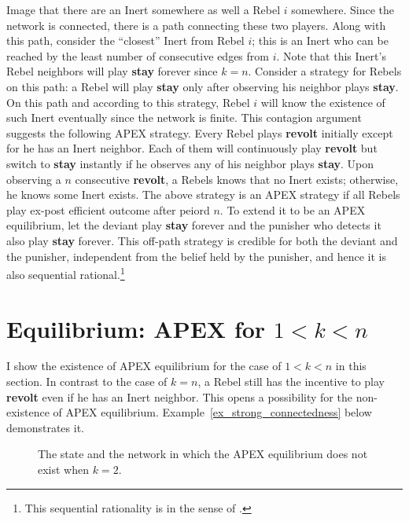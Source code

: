\documentclass[12pt,letter]{article}
\theoremstyle{definition}
\theoremstyle{remark}
\theoremstyle{claim}
\begin{document}
Image that there are an Inert somewhere as well a Rebel $i$ somewhere. Since the network is connected, there is a path connecting these two players. Along with this path, consider the ``closest'' Inert from Rebel $i$; this is an Inert who can be reached by the least number of consecutive edges from $i$. Note that this Inert's Rebel neighbors will play \textbf{stay} forever since $k=n$. Consider a strategy for Rebels on this path: a Rebel will play \textbf{stay} only after observing his neighbor plays \textbf{stay}.  On this path and according to this  strategy, Rebel $i$ will know the existence of such Inert eventually since the network is finite. This contagion argument suggests the following APEX strategy. Every Rebel plays \textbf{revolt} initially except for he has an Inert neighbor. Each of them will continuously play \textbf{revolt} but switch to \textbf{stay} instantly if he observes any of his neighbor plays \textbf{stay}. Upon observing a $n$ consecutive \textbf{revolt}, a Rebels knows that no Inert exists; otherwise, he knows some Inert exists. The above strategy is an APEX strategy if all Rebels play ex-post efficient outcome after peiord $n$. To extend it to be an APEX equilibrium, let the deviant play \textbf{stay} forever and the punisher who detects it also play \textbf{stay} forever. This off-path strategy is credible for both the deviant and the punisher, independent from the belief held by the punisher, and hence it is also sequential rational.\footnote{This sequential rationality is in the sense of \citep{Krep_Wilson1982}.}




\section{Equilibrium: APEX for $1<k<n$}
\label{sec:equilibrium_2}

I show the existence of APEX equilibrium for the case of $1<k<n$ in this section. In contrast to the case of $k=n$, a Rebel still has the incentive to play \textbf{revolt} even if he has an Inert neighbor. This opens a possibility for the non-existence of APEX equilibrium. Example~\ref{ex_strong_connectedness} below demonstrates it.

\begin{figure}

\begin{center}
\end{center}

\caption{The state and the network in which the APEX equilibrium does not exist when $k=2$.}
\label{fig:strong_connectedness}
\end{figure}
\end{document}
